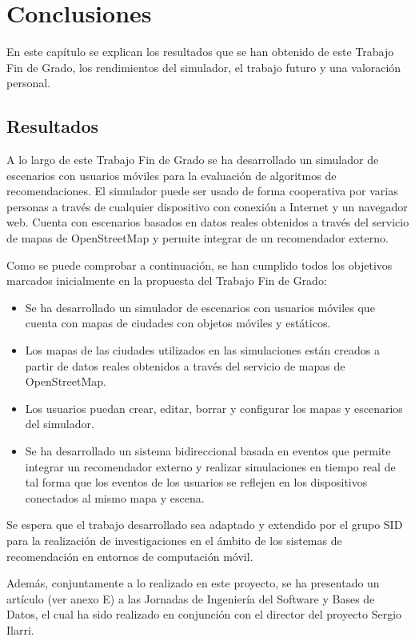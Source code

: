 \chapter{Conclusiones}

En este capítulo se explican los resultados que se han obtenido de este Trabajo Fin de Grado, los rendimientos del simulador, el trabajo futuro y una valoración personal.

\section{Resultados}

A lo largo de este Trabajo Fin de Grado se ha desarrollado un simulador de escenarios con usuarios móviles para la evaluación de algoritmos de recomendaciones. El simulador puede ser usado de forma cooperativa por varias personas a través de cualquier dispositivo con conexión a Internet y un navegador web. Cuenta con escenarios basados en datos reales obtenidos a través del servicio de mapas de OpenStreetMap y permite integrar de un recomendador externo.

Como se puede comprobar a continuación, se han cumplido todos los objetivos marcados inicialmente en la propuesta del Trabajo Fin de Grado:
\begin{itemize}
	\item Se ha desarrollado un simulador de escenarios con usuarios móviles que cuenta con mapas de ciudades con objetos móviles y estáticos.
	\item Los mapas de las ciudades utilizados en las simulaciones están creados a partir de datos reales obtenidos a través del servicio de mapas de OpenStreetMap.
	\item Los usuarios puedan crear, editar, borrar y configurar los mapas y escenarios del simulador.
	\item Se ha desarrollado un sistema bidireccional basada en eventos que permite integrar un recomendador externo y realizar simulaciones en tiempo real de tal forma que los eventos de los usuarios se reflejen en los dispositivos conectados al mismo mapa y escena.
\end{itemize}

Se espera que el trabajo desarrollado sea adaptado y extendido por el grupo SID para la realización de investigaciones en el ámbito de los sistemas de recomendación en entornos de computación móvil.

Además, conjuntamente a lo realizado en este proyecto, se ha presentado un artículo (ver anexo E) a las Jornadas de Ingeniería del Software y Bases de Datos, el cual ha sido realizado en conjunción con el director del proyecto Sergio Ilarri.

